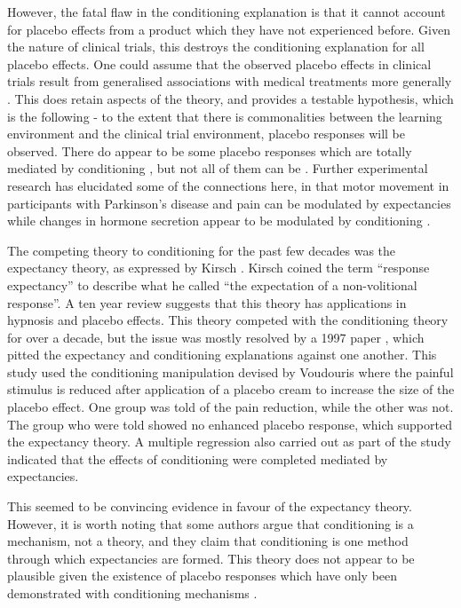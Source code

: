 However, the fatal flaw in the conditioning explanation is that it cannot account for placebo effects from a product which they have not experienced before. Given the nature of clinical trials, this destroys the conditioning explanation for all placebo effects.  One could assume that the observed placebo effects in clinical trials result from generalised associations with medical treatments more generally \cite{pearce1987model}. This does retain aspects of the theory, and provides a testable hypothesis, which is the following - to the extent that there is commonalities between the learning environment and the clinical trial environment, placebo responses will be observed.  There do appear to be some placebo responses which are totally mediated by conditioning \cite{Amanzio1999}, but not all of them can be \cite{Benedetti2003a}. Further experimental research has elucidated some of the connections here, in that motor movement in participants with Parkinson's disease and pain can be modulated by expectancies while changes in hormone secretion appear to be modulated by conditioning \cite{Benedetti2003a}.

The competing theory to conditioning for the past few decades was the expectancy theory, as expressed by Kirsch \cite{Kirsch1985} . Kirsch coined the term ``response expectancy'' to describe what he called ``the expectation of a non-volitional response''. A ten year review \cite{Kirsch1997}  suggests that this theory has applications in hypnosis and placebo effects. This theory competed with the conditioning theory for over a decade, but the issue was mostly resolved by a 1997 paper \cite{Montgomery1997}, which pitted the expectancy and conditioning explanations against one another. This study used the conditioning manipulation devised by Voudouris \cite{Voudouris1985} where the painful stimulus is reduced after application of a placebo cream to increase the size of the placebo effect. One group was told of the pain reduction, while the other was not. The group who were told showed no enhanced placebo response, which supported the expectancy theory. A multiple regression also carried out as part of the study indicated that the effects of conditioning were completed mediated by expectancies. 

This seemed to be convincing evidence in favour of the expectancy theory. However, it is worth noting that some authors \cite{Stewart-Williams2004a}  argue that conditioning is a mechanism, not a theory, and they claim that conditioning is one method through which expectancies are formed. This theory does not appear to be plausible given the existence of placebo responses which have only been demonstrated with conditioning mechanisms \cite{Benedetti2003a}.   

